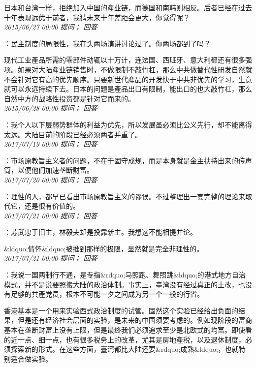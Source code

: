 \documentclass[twocolumn]{ctexart}
\begin{document}
日本和台湾一样，拒绝加入中国的產业链，而德国和南韩则相反。后者已经在过去十年表现远优于前者，我猜未来十年差距会更大，你觉得呢？\\

\textit{\hfill\noindent\small 2015/06/27 00:00 提问； 回答}

：民主制度的局限性，我在头两场演讲讨论过了。你两场都到了吗？

现代工业產品所需的零部件动辄以十万计，连法国、西班牙、意大利都还有很多强项。如果对大陆產业链销售时，不做限制不敲竹杠，那么中共做替代性研发自然就不会针对它有高的优先顺序。只要新世代產品的开发快于中共非优先的学习，生意就可以永远持续下去。日本的问题是產品出口有限制，能出口的也大敲竹杠，那么自然中方的战略性投资都是针对它而来的。\\

\textit{\hfill\noindent\small 2015/06/28 00:00 提问； 回答}

：我个人以下层弱势群体的利益为优先，所以发展虽必须比公义先行，却不能离得太远。大陆目前的阶段已经必须两者并重了。\\

\textit{\hfill\noindent\small 2017/07/19 00:00 提问； 回答}

：市场原教旨主义者的问题，不在于固守成规，而是本身就是金主扶持出来的传声筒，以便他们加速垄断财富。\\

\textit{\hfill\noindent\small 2017/07/20 00:00 提问； 回答}

：理性的人，都早已看出市场原教旨主义的谬误。不过整理出一套完整的理论来取代它，还是很有价值的。\\

\textit{\hfill\noindent\small 2017/07/21 00:00 提问； 回答}

：苏武忠于旧主，林毅夫却是投靠新主。我想这不能相提并论。

\&ldquo;情怀\&ldquo;被推到那样的极限，显然就是完全非理性的。\\

\textit{\hfill\noindent\small 2017/07/21 00:00 提问； 回答}

：我说一国两制行不通，是专指\&rdquo;马照跑、舞照跳\&ldquo;的港式地方自治模式，并不是说要照搬大陆的政治体制。事实上，臺湾没有经过真正的土改，也没有足够的共產党员，根本不可能一夕之间成为另一个一般的行省。

香港基本是一个用来实验西式政治制度的试管。固然这个实验已经给出负面的结果，但是还有经济社会层面的实验，是未来的中国须要考虑的。例如现阶段的富商基本在垄断财富上没有上限，但是最终我们必须追求至少是北欧式的均富。即使看的近一点、细一点，也有很多税务上的改革，尤其是房地產税，以及退休制度，必须探索新的形式。在这些方面，臺湾都比大陆还要\&rdquo;成熟\&ldquo;，也就特别适合做实验。
\end{document}
